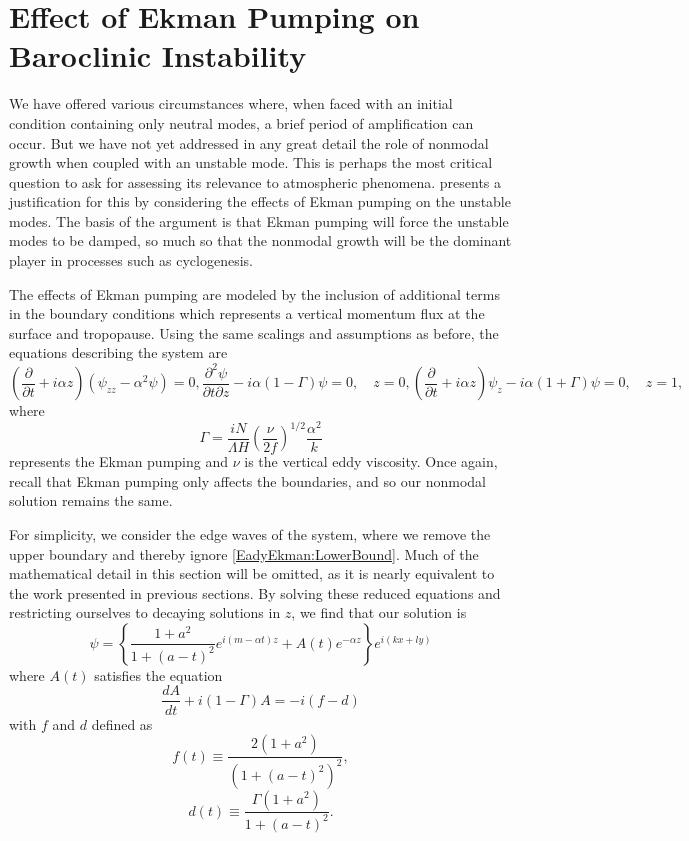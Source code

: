 \documentclass[letterpaper,11pt,onecolumn,twoside,titlepage]{article}
\newcommand{\pdiff}[2]{\frac{\partial #1}{\partial #2}}
\begin{document}

\section{Effect of Ekman Pumping on Baroclinic Instability}

We have offered various circumstances where, when faced with an initial condition containing only neutral modes, a brief period of amplification can occur. But we have not yet addressed in any great detail the role of nonmodal growth when coupled with an unstable mode. This is perhaps the most critical question to ask for assessing its relevance to atmospheric phenomena. \citet{Farrell:1985} presents a justification for this by considering the effects of Ekman pumping on the unstable modes. The basis of the argument is that Ekman pumping will force the unstable modes to be damped, so much so that the nonmodal growth will be the dominant player in processes such as cyclogenesis.

The effects of Ekman pumping are modeled by the inclusion of additional terms in the boundary conditions which represents a vertical momentum flux at the surface and tropopause. Using the same scalings and assumptions as before, the equations describing the system are
\begin{subequations}
\begin{equation}
\left(\pdiff{}{t} + i \alpha z\right)\left(\psi_{zz} - \alpha^2 \psi \right) = 0,
\end{equation}
\begin{equation}\label{EadyEkman:LowerBound}
\pdiff{^2 \psi}{t\partial z} - i \alpha(1 - \Gamma)\psi = 0, \quad z = 0,
\end{equation}
\begin{equation}\label{EadyEkman:UpperBound}
\left(\pdiff{}{t} + i \alpha z \right)\psi_z - i \alpha(1 + \Gamma) \psi = 0, \quad z = 1,
\end{equation}
\end{subequations}
where
\[
\Gamma = \frac{iN}{\Lambda H} \left(\frac{\nu}{2f}\right)^{1/2} \frac{\alpha^2}{k}
\]
represents the Ekman pumping and $\nu$ is the vertical eddy viscosity. Once again, recall that Ekman pumping only affects the boundaries, and so our nonmodal solution remains the same.

For simplicity, we consider the edge waves of the system, where we remove the upper boundary and thereby ignore \eqref{EadyEkman:LowerBound}. Much of the mathematical detail in this section will be omitted, as it is nearly equivalent to the work presented in previous sections. By solving these reduced equations and restricting ourselves to decaying solutions in $z$, we find that our solution is
\[
\psi = \left\{\frac{1+a^2}{1+(a-t)^2} e^{i(m-\alpha t)z} + A(t) e^{-\alpha z} \right\} e^{i(kx + ly)}
\]
where $A(t)$ satisfies the equation
\[
\frac{dA}{dt} + i(1-\Gamma)A = -i(f-d)
\]
with $f$ and $d$ defined as
\[
f(t) \equiv \frac{2(1+a^2)}{(1+(a-t)^2)^2},
\] \[
d(t) \equiv \frac{\Gamma(1+a^2)}{1+(a-t)^2}.
\]
\end{document}
